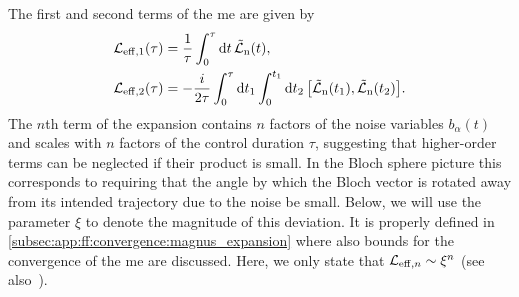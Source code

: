 The first and second terms of the \gls{me} are given by~\cite{Magnus1954,Blanes2009}
\begin{subequations}\label{eq:ff:magnus_expansion}
\begin{align}
    \Li_\mr{eff,1}(\tau) &= \frac{1}{\tau}\int_0^\tau\dd{t}\Lnt(t), \label{eq:ff:magnus_expansion:1}\\
    \Li_\mr{eff,2}(\tau) &= -\frac{\i}{2\tau}\int_0^\tau\dd{t_1}\int_0^{t_1}\dd{t_2}\comm{\Lnt(t_1)}{\Lnt(t_2)}. \label{eq:ff:magnus_expansion:2}
\end{align}
\end{subequations}
The $n$th term of the expansion contains $n$ factors of the noise variables $b_\alpha(t)$ and scales with $n$ factors of the control duration $\tau$, suggesting that higher-order terms can be neglected if their product is small.
In the Bloch sphere picture this corresponds to requiring that the angle by which the Bloch vector is rotated away from its intended trajectory due to the noise be small.
Below, we will use the parameter $\xi$ to denote the magnitude of this deviation.
It is properly defined in \cref{subsec:app:ff:convergence:magnus_expansion} where also bounds for the convergence of the \gls{me} are discussed.
Here, we only state that $\mathcal{L}_{\mathrm{eff},n}\sim\xi^n$ (see also~).

